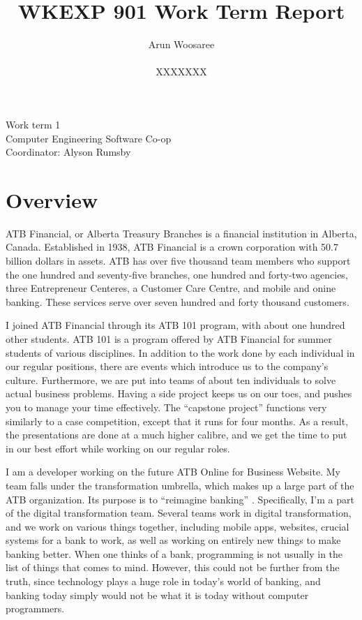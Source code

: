 \documentclass[letterpaper,12pt]{article}
\title{WKEXP 901 Work Term Report}
\author{Arun Woosaree \\ \\  XXXXXXX}
\begin{document}
\relax
\begin{titlepage}
 \maketitle
 \thispagestyle{empty} %
 \centering
 \large
 \vspace{1cm}
 Work term 1\\
 \vspace{1cm}
 Computer Engineering Software Co-op \\
 \vspace{1cm}
 Coordinator: Alyson Rumsby
\end{titlepage}

\section{Overview}

ATB Financial, or Alberta Treasury Branches is a financial institution in Alberta, Canada.
Established in 1938, ATB Financial is a crown corporation with 50.7 billion dollars in assets.\cite{annualreport2018}
ATB has over five thousand team members who support the one hundred and seventy-five branches, one hundred and forty-two
agencies, three Entrepreneur Centeres, a Customer Care Centre, and mobile and onine banking.
These services serve over seven hundred and forty thousand customers. \cite{annualreport2018, annualreport2017}

I joined ATB Financial through its ATB 101 program, with about one hundred other students.
ATB 101 is a program offered by ATB Financial for summer students of various disciplines. 
In addition to the work done by each individual
in our regular positions, there are events which introduce us to the company's culture.
Furthermore, we are put into teams of about ten individuals to solve actual business problems.
Having a side project keeps us on our toes, and pushes you to manage your time effectively.
The ``capstone project'' functions very similarly to a case competition, except that it runs 
for four months. As a result, the presentations are done at a much higher calibre, and we get 
the time to put in our best effort while working on our regular roles.

I am a developer working on the future ATB Online for Business Website. My team falls under the
transformation umbrella, which
makes up a large part of the ATB organization. Its purpose is to ``reimagine banking'' \cite{atbstory}.
Specifically, I'm a part of the digital transformation team. 
Several teams work in digital transformation, and we work on various
things together, including mobile apps, websites, crucial systems for a bank to work, 
as well as working on entirely new things to make banking better. When one thinks of a bank,
programming is not usually in the list of things that comes to mind. However, this could not be
further from the truth, since technology
plays a huge role in today's world of banking, and banking today simply would not be what it is
today without computer programmers.
\end{document}
